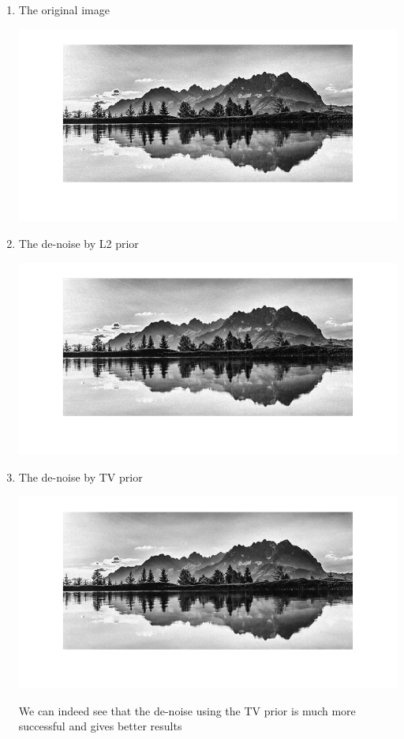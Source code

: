 \documentclass[a4paper]{iacas}
\begin{document}
\begin{enumerate}
\item The original image
\vskip 0.1in
\begin{minipage}{0.5\textwidth}
\centering
	\includegraphics[scale=0.7]{output/q5/original_image.png}
\end{minipage}
\vskip 0.1in


\item The de-noise by L2 prior

\vskip 0.1in
\begin{minipage}{0.5\textwidth}
\centering
	\includegraphics[scale=0.7]{output/q5/image_L2_denoise.png}
\end{minipage}
\vskip 0.1in

\item The de-noise by TV prior

\vskip 0.1in
\begin{minipage}{0.5\textwidth}
\centering
	\includegraphics[scale=0.7]{output/q5/image_TV_denoise.png}
\end{minipage}
\vskip 0.1in

We can indeed see that the de-noise using the TV prior is much more successful and gives better results
\end{enumerate}
\end{document}
